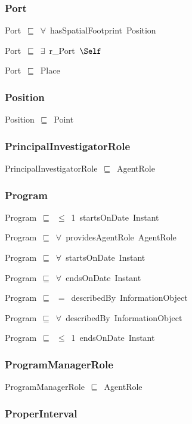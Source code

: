\documentclass{article}
\begin{document}
\subsubsection*{Port}

Port~\ensuremath{\sqsubseteq}~\ensuremath{\forall}~hasSpatialFootprint~Position~

Port~\ensuremath{\sqsubseteq}~\ensuremath{\exists}~r\_Port~\ensuremath{\Self}~

Port~\ensuremath{\sqsubseteq}~Place~

\subsubsection*{Position}

Position~\ensuremath{\sqsubseteq}~Point~

\subsubsection*{PrincipalInvestigatorRole}

PrincipalInvestigatorRole~\ensuremath{\sqsubseteq}~AgentRole~

\subsubsection*{Program}

Program~\ensuremath{\sqsubseteq}~\ensuremath{\leq}~1~startsOnDate~Instant~

Program~\ensuremath{\sqsubseteq}~\ensuremath{\forall}~providesAgentRole~AgentRole~

Program~\ensuremath{\sqsubseteq}~\ensuremath{\forall}~startsOnDate~Instant~

Program~\ensuremath{\sqsubseteq}~\ensuremath{\forall}~endsOnDate~Instant~

Program~\ensuremath{\sqsubseteq}~\ensuremath{=}~describedBy~InformationObject~

Program~\ensuremath{\sqsubseteq}~\ensuremath{\forall}~describedBy~InformationObject~

Program~\ensuremath{\sqsubseteq}~\ensuremath{\leq}~1~endsOnDate~Instant~

\subsubsection*{ProgramManagerRole}

ProgramManagerRole~\ensuremath{\sqsubseteq}~AgentRole~

\subsubsection*{ProperInterval}
\end{document}
